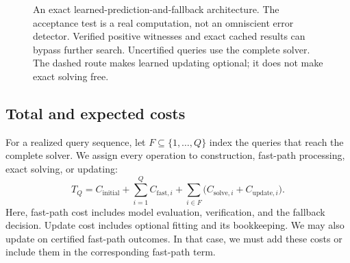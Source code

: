 \documentclass[11pt,a4paper]{article}
\numberwithin{equation}{section}
\theoremstyle{plain}
\theoremstyle{definition}
\theoremstyle{remark}
\begin{document}
\begin{figure}[tbp]
\centering
{}
\caption{An exact learned-prediction-and-fallback architecture. The acceptance test is a real computation, not an omniscient error detector. Verified positive witnesses and exact cached results can bypass further search. Uncertified queries use the complete solver. The dashed route makes learned updating optional; it does not make exact solving free.}
\label{fig:hybrid}
\end{figure}

\subsection{Total and expected costs}

For a realized query sequence, let $F\subseteq\{1,\ldots,Q\}$ index the queries that reach the complete solver. We assign every operation to construction, fast-path processing, exact solving, or updating:
\begin{equation}
T_Q=C_{\mathrm{initial}}+
\sum_{i=1}^{Q}C_{\mathrm{fast},i}+
\sum_{i\in F}\bigl(C_{\mathrm{solve},i}+C_{\mathrm{update},i}\bigr).
\label{eq:hybrid-cost}
\end{equation}
Here, fast-path cost includes model evaluation, verification, and the fallback decision. Update cost includes optional fitting and its bookkeeping. We may also update on certified fast-path outcomes. In that case, we must add these costs or include them in the corresponding fast-path term.
\end{document}
